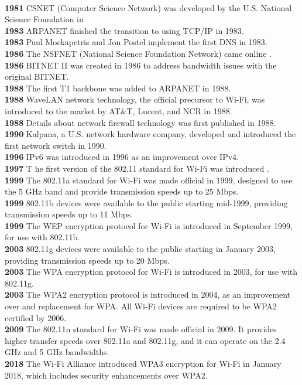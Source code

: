 \documentclass [12pt, a4paper]{article}
\begin{document}
\\ \textbf{1981}		CSNET (Computer Science Network) was developed by the U.S. National Science Foundation in 
\\ \textbf{1983}		ARPANET finished the transition to using TCP/IP in 1983.
\\ \textbf{1983}		Paul Mockapetris and Jon Postel implement the first DNS in 1983.
\\ \textbf{1986}		The NSFNET (National Science Foundation Network) came online .
\\ \textbf{1986}		BITNET II was created in 1986 to address bandwidth issues with the original BITNET.
\\ \textbf{1988}		The first T1 backbone was added to ARPANET in 1988.
\\ \textbf{1988}		WaveLAN network technology, the official precursor to Wi-Fi, was introduced to the market by AT\&T, Lucent, and NCR in 1988.
\\ \textbf{1988}		Details about network firewall technology was first published in 1988. 
\\ \textbf{1990}		Kalpana, a U.S. network hardware company, developed and introduced the first network switch in 1990.
\\ \textbf{1996}		IPv6 was introduced in 1996 as an improvement over IPv4.
\\ \textbf{1997}	T	he first version of the 802.11 standard for Wi-Fi was introduced .
\\ \textbf{1999}		The 802.11a standard for Wi-Fi was made official in 1999, designed to use the 5 GHz band and provide transmission speeds up to 25 Mbps.
\\ \textbf{1999}		802.11b devices were available to the public starting mid-1999, providing transmission speeds up to 11 Mbps.
\\ \textbf{1999}		The WEP encryption protocol for Wi-Fi is introduced in September 1999, for use with 802.11b.
\\ \textbf{2003}		802.11g devices were available to the public starting in January 2003, providing transmission speeds up to 20 Mbps.
\\ \textbf{2003}		The WPA encryption protocol for Wi-Fi is introduced in 2003, for use with 802.11g.
\\ \textbf{2003}		The WPA2 encryption protocol is introduced in 2004, as an improvement over and replacement for WPA. All Wi-Fi devices are required to be WPA2 certified by 2006.
\\ \textbf{2009}	The 802.11n standard for Wi-Fi was made official in 2009. It provides higher transfer speeds over 802.11a and 802.11g, and it can operate on the 2.4 GHz and 5 GHz bandwidths.
\\ \textbf{2018}	The Wi-Fi Alliance introduced WPA3 encryption for Wi-Fi in January 2018, which includes security enhancements over WPA2.
\end{document}
